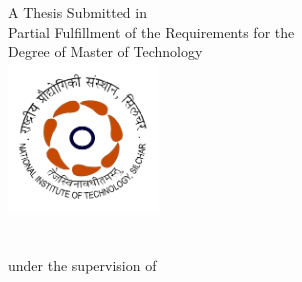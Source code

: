 \begin{titlepage}
    \begin{center}
        \vspace{1cm}
        \LARGE
        \textbf{\thesistitle}
        
        \vspace{1cm}
        \large{A Thesis Submitted in\\
Partial Fulfillment of the Requirements for the\\
Degree of Master of Technology}\\[8pt]
        
        \vspace{1cm}
        \includegraphics[width=0.3\textwidth]{images/NIT_Silchar_logo.png}\\
        \vspace{0.5cm}
        \LARGE
        \textbf{\authornamefl}\\
        \authorcnp\\
        \vspace{1.5cm}
        \Large
        under the supervision of\\
        \LARGE
        \textbf{\coordinator}\\
        \vspace{1.5cm}
        \Large
        \textbf{\faculty}\\
        \Large
        {\university}\\
        \Large \promotion
    \end{center}
\end{titlepage}